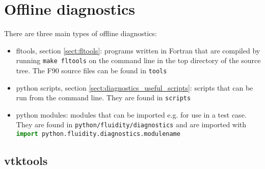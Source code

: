 
\section{Offline diagnostics}
\label{sect:offline_diagnostics}

There are three main types of offline diagnostics:
\begin{itemize}
\item fltools, section \ref{sect:fltools}: programs written in Fortran that are compiled by running \lstinline[language = XML]+make fltools+ on the command line in the top directory of the \fluidity source tree. The F90 source files can be found in \lstinline[language = XML]+tools+
\item python scripts, section \ref{sect:diagnostics_useful_scripts}: scripts that can be run from the command line. They are found in \lstinline[language = XML]+scripts+
\item python modules: modules that can be imported e.g. for use in a test case. They are found in \lstinline[language = XML]+python/fluidity/diagnostics+ and are imported with  \\ \lstinline[language = python]+import python.fluidity.diagnostics.modulename+
\end{itemize}

\subsection{vtktools}
\label{sect:diagnostics_vtk_tools}

